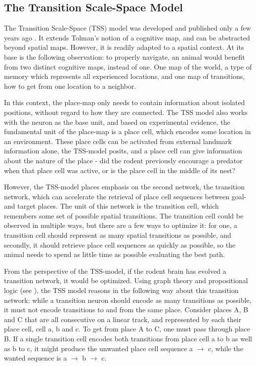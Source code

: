 \documentclass{article}
\begin{document}
    \subsection{The Transition Scale-Space Model} \label{TSS}
    The Transition Scale-Space (TSS) model was developed and published only a few years ago \parencite{Waniek2020}. It extends Tolman's notion of a cognitive map, and can be abstracted beyond spatial maps. However, it is readily adapted to a spatial context. At its base is the following observation: to properly navigate, an animal would benefit from two distinct cognitive maps, instead of one. One map of the world, a type of memory which represents all experienced locations, and one map of transitions, how to get from one location to a neighbor.

    In this context, the place-map only needs to contain information about isolated positions, without regard to how they are connected. The TSS model also works with the neuron as the base unit, and based on experimental evidence, the fundamental unit of the place-map is a place cell, which encodes some location in an environment. These place cells can be activated from external landmark information alone, the TSS-model posits, and a place cell can give information about the nature of the place - did the rodent previously encourage a predator when that place cell was active, or is the place cell in the middle of its nest?

    However, the TSS-model places emphasis on the second network, the transition network, which can accelerate the retrieval of place cell sequences between goal- and target places. The unit of this network is the transition cell, which remembers some set of possible spatial transitions. The transition cell could be observed in multiple ways, but there are a few ways to optimize it: for one, a transition cell should represent as many spatial transitions as possible, and secondly, it should retrieve place cell sequences as quickly as possible, so the animal needs to spend as little time as possible evaluating the best path.

    From the perspective of the TSS-model, if the rodent brain has evolved a transition network, it would be optimized. Using graph theory and propositional logic (see \cite{Waniek2018}), the TSS model reasons in the following way about this transition network: while a transition neuron should encode as many transitions as possible, it must not encode transitions to and from the same place. Consider places A, B and C that are all consecutive on a linear track, and represented by each their place cell, cell a, b and c. To get from place A to C, one must pass through place B. If a single transition cell encodes both transitions from place cell a to b as well as b to c, it might produce the unwanted place cell sequence a \(\rightarrow\) c, while the wanted sequence is a \(\rightarrow\) b \(\rightarrow\) c.
\end{document}
